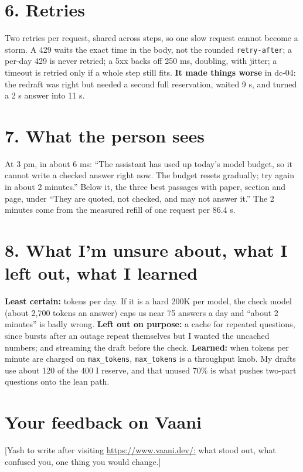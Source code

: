 \documentclass[10pt]{article}
\begin{document}
\section*{6. Retries}

Two retries per request, shared across steps, so one slow request cannot become a storm. A 429 waits the exact time in the body, not the rounded \texttt{retry-after}; a per-day 429 is never retried; a 5xx backs off 250 ms, doubling, with jitter; a timeout is retried only if a whole step still fits. \textbf{It made things worse} in dc-04: the redraft was right but needed a second full reservation, waited 9 s, and turned a 2 s answer into 11 s.

\section*{7. What the person sees}

At 3 pm, in about 6 ms: ``The assistant has used up today's model budget, so it cannot write a checked answer right now. The budget resets gradually; try again in about 2 minutes.'' Below it, the three best passages with paper, section and page, under ``They are quoted, not checked, and may not answer it.'' The 2 minutes come from the measured refill of one request per 86.4 s.

\section*{8. What I'm unsure about, what I left out, what I learned}

\textbf{Least certain:} tokens per day. If it is a hard 200K per model, the check model (about 2,700 tokens an answer) caps us near 75 answers a day and ``about 2 minutes'' is badly wrong. \textbf{Left out on purpose:} a cache for repeated questions, since bursts after an outage repeat themselves but I wanted the uncached numbers; and streaming the draft before the check. \textbf{Learned:} when tokens per minute are charged on \texttt{max\_tokens}, \texttt{max\_tokens} is a throughput knob. My drafts use about 120 of the 400 I reserve, and that unused 70\% is what pushes two-part questions onto the lean path.

\section*{Your feedback on Vaani}

[Yash to write after visiting \url{https://www.vaani.dev/:} what stood out, what confused you, one thing you would change.]
\end{document}
